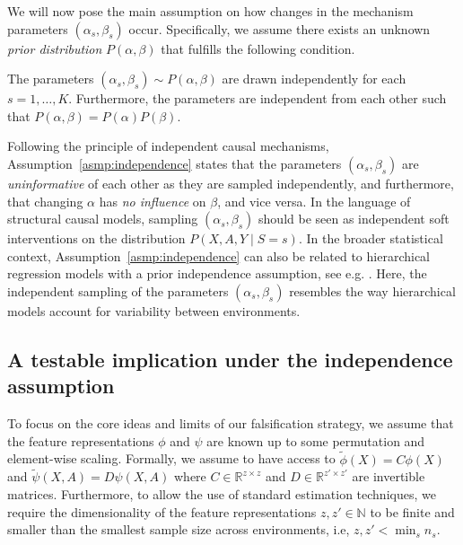 \documentclass{article}
\begin{document}
We will now pose the main assumption on how changes in the mechanism parameters $(\alpha_s, \beta_s)$ occur. Specifically, we assume there exists an unknown \textit{prior distribution} $P(\alpha, \beta)$ that fulfills the following condition.
\begin{assumption}\label{asmp:independence}
    The parameters $(\alpha_s,\beta_s)\sim P(\alpha, \beta)$ are drawn independently for each $s=1,\dots,K$. Furthermore, the parameters are independent from each other such that $P(\alpha, \beta)=P(\alpha)P(\beta)$.
\end{assumption}
Following the principle of independent causal mechanisms, Assumption~\ref*{asmp:independence} states that the parameters $(\alpha_s,\beta_s)$ are \textit{uninformative} of each other as they are sampled independently, and furthermore, that changing $\alpha$ has \textit{no influence} on $\beta$, and vice versa. In the language of structural causal models, sampling $(\alpha_s,\beta_s)$ should be seen as independent soft interventions on the distribution $P(X,A,Y \mid S=s)$. In the broader statistical context, Assumption~\ref*{asmp:independence} can also be related to hierarchical regression models with a prior independence assumption, see e.g. \citet[Chapter~11]{gelman2007data}. Here, the independent sampling of the parameters $(\alpha_s,\beta_s)$ resembles the way hierarchical models account for variability between  environments. 

\subsection{A testable implication under the independence assumption}

To focus on the core ideas and limits of our falsification strategy, we assume that the feature representations $\phi$ and $\psi$ are known up to some permutation and element-wise scaling. Formally, we assume to have access to $\widetilde{\phi}(X)=C\phi(X)$ and $\widetilde{\psi}(X,A)=D\psi(X,A)$ where $C\in\mathbb{R}^{z\times z}$ and $D\in\mathbb{R}^{z'\times z'}$ are invertible matrices. Furthermore, to allow the use of standard estimation techniques, we require the dimensionality of the feature representations $z, z' \in \mathbb{N}$ to be finite and smaller than the smallest sample size across environments, i.e, $z, z' < \min_s n_s$.  
\end{document}
